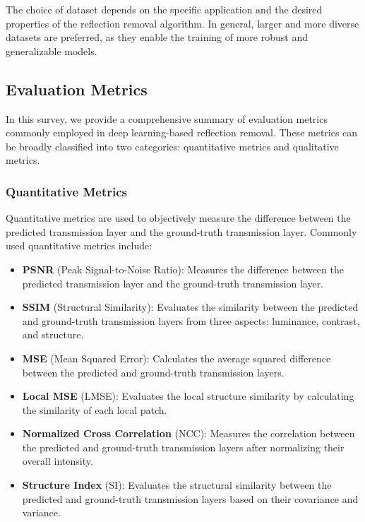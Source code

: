 The choice of dataset depends on the specific application and the desired properties of the reflection removal algorithm. In general, larger and more diverse datasets are preferred, as they enable the training of more robust and generalizable models.

\subsection{Evaluation Metrics}

In this survey, we provide a comprehensive summary of evaluation metrics commonly employed in deep learning-based reflection removal. These metrics can be broadly classified into two categories: quantitative metrics and qualitative metrics.

\subsubsection{Quantitative Metrics}

Quantitative metrics are used to objectively measure the difference between the predicted transmission layer and the ground-truth transmission layer. Commonly used quantitative metrics include:

\begin{itemize}
\item \textbf{PSNR} (Peak Signal-to-Noise Ratio): Measures the difference between the predicted transmission layer and the ground-truth transmission layer. 
\item \textbf{SSIM} (Structural Similarity): Evaluates the similarity between the predicted and ground-truth transmission layers from three aspects: luminance, contrast, and structure. 
\item \textbf{MSE} (Mean Squared Error): Calculates the average squared difference between the predicted and ground-truth transmission layers. 
\item \textbf{Local MSE} (LMSE): Evaluates the local structure similarity by calculating the similarity of each local patch. 
\item \textbf{Normalized Cross Correlation} (NCC): Measures the correlation between the predicted and ground-truth transmission layers after normalizing their overall intensity. 
\item \textbf{Structure Index} (SI): Evaluates the structural similarity between the predicted and ground-truth transmission layers based on their covariance and variance. 
\end{itemize}

